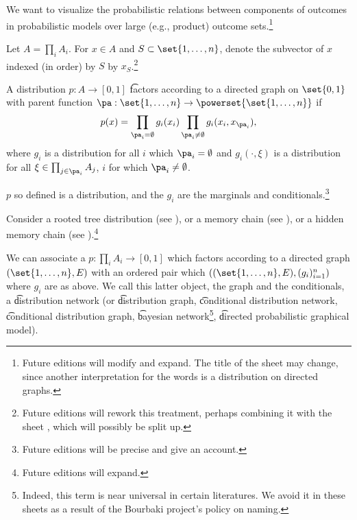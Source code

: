 

We want to visualize the probabilistic relations between components of outcomes in probabilistic models over large (e.g., product) outcome sets.\footnote{Future editions will modify and expand. The title of the sheet may change, since another interpretation for the words  is a distribution on directed graphs.}


Let $A = \prod_{i} A_i$.
For $x \in A$ and $S \subset \set{1, \dots, n}$, denote the subvector of $x$ indexed (in order) by $S$ by $x_S$.\footnote{Future editions will rework this treatment, perhaps combining it with the sheet , which will possibly be split up.}

A distribution $p: A \to [0, 1]$ \t{factors according to a directed graph} on $\set{0, 1}$ with parent function $\pa: \set{1,\dots,n} \to \powerset{\set{1, \dots, n}}$ if
\[
  p(x) = \prod_{\pa_i = \emptyset} g_i(x_i) \prod_{\pa_i \neq \emptyset} g_{i}(x_i, x_{\pa_i}),
\]
where  $g_i$ is a distribution for all $i$ which $\pa_i = \emptyset$ and $g_{i}(\cdot, \xi)$ is a distribution for all $\xi \in \prod_{j \in \pa_i} A_j$, $i$ for which $\pa_i \neq \emptyset$.


\begin{proposition}
  $p$ so defined is a distribution, and the $g_i$ are the marginals and conditionals.\footnote{Future editions will be precise and give an account.}
\end{proposition}


Consider a rooted tree distribution (see ), or a memory chain (see ), or a hidden memory chain (see ).\footnote{Future editions will expand.}


We can associate a $p: \prod_{i} A_i \to [0, 1]$ which factors according to a directed graph $(\set{1, \dots, n}, E)$ with an ordered pair which $((\set{1, \dots, n}, E), (g_i)_{i = 1}^{n})$ where $g_i$ are as above.
We call this latter object, the graph and the conditionals, a \t{distribution network} (or \t{distribution graph}, \t{conditional distribution network}, \t{conditional distribution graph}, \t{bayesian network}\footnote{Indeed, this term is near universal in certain literatures. We avoid it in these sheets as a result of the Bourbaki project's policy on naming.}, \t{directed probabilistic graphical model}).

